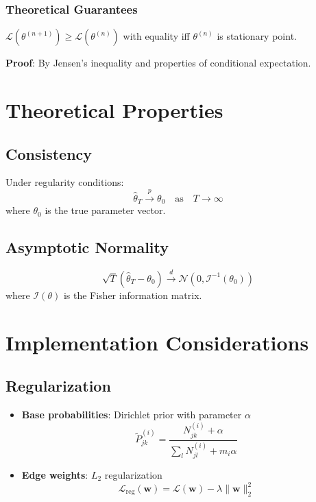 \documentclass[answers,12pt,addpoints]{exam}
\begin{document}
\subsubsection{Theoretical Guarantees}
\begin{theorem}[Monotonicity]
$\mathcal{L}(\theta^{(n+1)}) \geq \mathcal{L}(\theta^{(n)})$ with equality iff $\theta^{(n)}$ is stationary point.
\end{theorem}
\textbf{Proof}: By Jensen's inequality and properties of conditional expectation.

\section{Theoretical Properties}

\subsection{Consistency}
Under regularity conditions:
\begin{equation}
\hat{\theta}_T \xrightarrow{p} \theta_0 \quad \text{as} \quad T \to \infty
\end{equation}
where $\theta_0$ is the true parameter vector.

\subsection{Asymptotic Normality}
\begin{equation}
\sqrt{T} (\hat{\theta}_T - \theta_0) \xrightarrow{d} \mathcal{N}(0, \mathcal{I}^{-1}(\theta_0))
\end{equation}
where $\mathcal{I}(\theta)$ is the Fisher information matrix.

\section{Implementation Considerations}

\subsection{Regularization}
\begin{itemize}
    \item \textbf{Base probabilities}: Dirichlet prior with parameter $\alpha$
    \begin{equation}
    \tilde{P}^{(i)}_{jk} = \frac{N^{(i)}_{jk} + \alpha}{\sum_l N^{(i)}_{jl} + m_i \alpha}
    \end{equation}
    
    \item \textbf{Edge weights}: $L_2$ regularization
    \begin{equation}
    \mathcal{L}_{\text{reg}}(\mathbf{w}) = \mathcal{L}(\mathbf{w}) - \lambda \|\mathbf{w}\|_2^2
    \end{equation}
\end{itemize}
\end{document}
